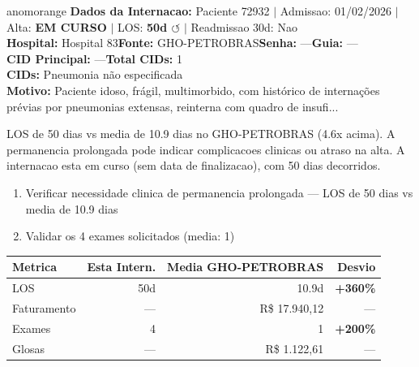 \documentclass[a4paper,10pt]{article}
\begin{document}
\begin{anomalycard}[Internacao 163837 | GHO-PETROBRAS | ALTO (z=3.08)]{anomorange}
\textbf{Dados da Internacao:} Paciente 72932 $\mid$ Admissao: 01/02/2026 $\mid$ Alta: \textcolor{anomorange}{\textbf{EM CURSO}} $\mid$ LOS: \textbf{50d \textcolor{anomorange}{$\circlearrowleft$}} $\mid$ Readmissao 30d: Nao\\
\textbf{Hospital:} Hospital 83\quad\textbf{Fonte:} GHO-PETROBRAS\quad\textbf{Senha:} ---\quad\textbf{Guia:} ---\\
\textbf{CID Principal:} {\small ---}\quad\textbf{Total CIDs:} 1\\

\textbf{CIDs:} {\scriptsize Pneumonia não especificada}\\

\textbf{Motivo:} {\scriptsize Paciente idoso, frágil, multimorbido, com histórico de internações prévias por pneumonias extensas, reinterna com quadro de insufi...}\\

\vspace{2pt}\begin{tcolorbox}[colback=severityred!20,colframe=anomorange,title={\textbf{Interpretacao de Negocio}},fonttitle=\bfseries\small,left=4pt,right=4pt,top=3pt,bottom=3pt]
{\small LOS de 50 dias vs media de 10.9 dias no GHO-PETROBRAS (4.6x acima). A permanencia prolongada pode indicar complicacoes clinicas ou atraso na alta. A internacao esta em curso (sem data de finalizacao), com 50 dias decorridos.}
\end{tcolorbox}
\begin{tcolorbox}[colback=severityyellow!30,colframe=anomorange,title={\textbf{Recomendacoes Especificas}},fonttitle=\bfseries\small,left=4pt,right=4pt,top=3pt,bottom=3pt]
\begin{enumerate}[nosep,leftmargin=16pt]
\item {\small Verificar necessidade clinica de permanencia prolongada --- LOS de 50 dias vs media de 10.9 dias}
\item {\small Validar os 4 exames solicitados (media: 1)}
\end{enumerate}
\end{tcolorbox}
\begin{center}\begin{tabular}{l r r r}\toprule\textbf{Metrica} & \textbf{Esta Intern.} & \textbf{Media GHO-PETROBRAS} & \textbf{Desvio} \\\midrule
LOS & 50d & 10.9d & \textcolor{anomred}{\textbf{+360\%}} \\
Faturamento & --- & R\$ 17.940,12 & --- \\
Exames & 4 & 1 & \textcolor{anomred}{\textbf{+200\%}} \\
Glosas & --- & R\$ 1.122,61 & --- \\
\bottomrule\end{tabular}\end{center}


\end{anomalycard}
\end{document}
